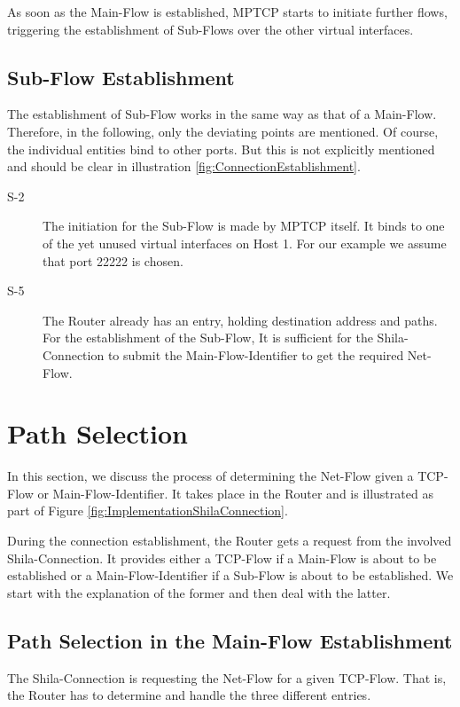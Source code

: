 As soon as the Main-Flow is established, MPTCP starts to initiate further flows, triggering the establishment of Sub-Flows over the other virtual interfaces.

\subsection*{Sub-Flow Establishment}

The establishment of Sub-Flow works in the same way as that of a Main-Flow. Therefore, in the following, only the deviating points are mentioned. Of course, the individual entities bind to other ports. But this is not explicitly mentioned and should be clear in illustration \ref{fig:ConnectionEstablishment}.

\begin{description}	
\item[S-2] The initiation for the Sub-Flow is made by MPTCP itself. It binds to one of the yet unused virtual interfaces on Host 1. For our example we assume that port 22222 is chosen. 
\item[S-5] The Router already has an entry, holding destination address and paths. For the establishment of the Sub-Flow, It is sufficient for the Shila-Connection to submit the Main-Flow-Identifier to get the required Net-Flow.
\end{description}

\newpage
\section{Path Selection}
\label{sec:ImplementationPathSelection}

In this section, we discuss the process of determining the Net-Flow given a TCP-Flow or Main-Flow-Identifier. It takes place in the Router and is illustrated as part of Figure \ref{fig:ImplementationShilaConnection}.

During the connection establishment, the Router gets a request from the involved Shila-Connection. It provides either a TCP-Flow if a Main-Flow is about to be established or a Main-Flow-Identifier if a Sub-Flow is about to be established. We start with the explanation of the former and then deal with the latter.

\subsection*{Path Selection in the Main-Flow Establishment}

The Shila-Connection is requesting the Net-Flow for a given TCP-Flow. That is, the Router has to determine and handle the three different entries.


